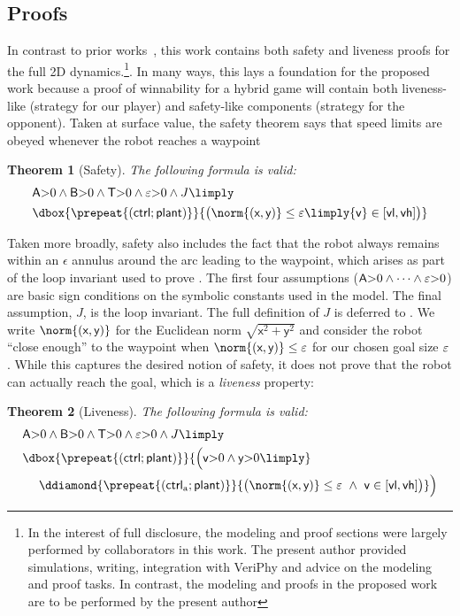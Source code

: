 \documentclass[12pt]{cmuthesis}
\newtheorem{theorem}{Theorem}
\theoremstyle{definition}
\theoremstyle{remark}
\newcommand{\xgvar}{\textsf{x}}
\newcommand{\ygvar}{\textsf{y}}
\newcommand{\yvar}{\textsf{y}}
\newcommand{\vlvar}{\textsf{vl}}
\newcommand{\vhvar}{\textsf{vh}}
\newcommand{\Tvar}{{\sf T}\xspace}
\newcommand{\Avar}{{\sf A}\xspace}
\newcommand{\Bvar}{{\sf B}\xspace}
\newcommand{\vvar}{{\sf v}\xspace}
\newcommand{\avar}{{\sf a}\xspace}
\newcommand{\ctrl}{\textsf{ctrl}\xspace}
\newcommand{\ctrlliv}{\ctrl_{\text{a}}}
\newcommand{\plant}{\textsf{plant}\xspace}
\newcommand{\enorm}[1]{\norm{#1}}
\newcommand{\linv}{J}
\newcommand{\rref}[2][]{\prettyref{#2}}
\newcommand{\VeriPhy}{VeriPhy\xspace}
\begin{document}
\subsection{Proofs}
In contrast to prior works~\cite{DBLP:journals/ijrr/MitschGVP17}, this work contains both safety and liveness proofs for the full 2D dynamics.\footnote{In the interest of full disclosure, the modeling and proof sections were largely performed by collaborators in this work. The present author provided simulations, writing, integration with \VeriPhy and advice on the modeling and proof tasks. In contrast, the modeling and proofs in the proposed work are to be performed by the present author}.
In many ways, this lays a foundation for the proposed work because a proof of winnability for a hybrid game will contain both liveness-like (strategy for our player) and safety-like components (strategy for the opponent).
Taken at surface value, the safety theorem says that speed limits are obeyed whenever the robot reaches a waypoint
\begin{theorem}[Safety]
\label{thm:safe}
The following \dL formula is valid:
\begin{align*}
&\Avar{>}0 \land \Bvar{>}0 \land \Tvar{>}0 \land \veps{>}0 \land \linv \limply \\
&\dbox{\prepeat{(\ctrl;\plant)}}{\big(\enorm{(\xgvar,\ygvar)} \leq \veps \limply \vvar \in [\vlvar,\vhvar]\big)}
\end{align*}
\end{theorem}
Taken more broadly, safety also includes the fact that the robot always remains within an $\epsilon$ annulus around the arc leading to the waypoint, which arises as part of the loop invariant used to prove \rref{thm:safe}.
The first four assumptions ($\Avar{>}0 \land \dots \land \veps{>}0$) are basic sign conditions on the symbolic constants used in the model. 
The final assumption, $\linv$, is the loop invariant.
The full definition of $\linv$ is deferred to \rref{sec:ground-robotics}.
We write $\enorm{(\xgvar,\ygvar)}$ for the Euclidean norm $\sqrt{\xgvar^2 + \ygvar^2}$ and consider the robot ``close enough'' to the waypoint when $\enorm{(\xgvar,\ygvar)} \leq \veps$ for our chosen goal size $\varepsilon$.
While this captures the desired notion of safety, it does not prove that the robot can actually reach the goal, which is a \emph{liveness} property:
\begin{theorem}[Liveness]
\label{thm:liveness}
The following \dL formula is valid:
\begin{align*}
&\Avar{>}0 \land \Bvar{>}0 \land \Tvar{>}0 \land \veps{>}0 \land \linv \limply \\
&\dbox{\prepeat{(\ctrl;\plant)}}{\Big( \vvar{>}0 \land \yvar{>}0 \limply }\\
&\ \ \ \ \ddiamond{\prepeat{(\ctrlliv;\plant)}}{\big(\enorm{(\xgvar,\ygvar)} \leq \veps~\land~\vvar \in [\vlvar,\vhvar]\big)} \Big)
\end{align*}
\end{theorem}
\end{document}
